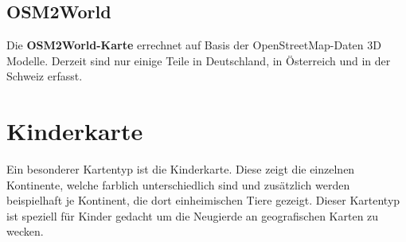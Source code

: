 \documentclass[10pt]{scrreprt}
\begin{document}
\vspace{3mm}
\begin{figure}[!htb]
	\centering
    \hspace{5mm}
\end{figure} 




\subsection{OSM2World}  
Die \textbf{OSM2World-Karte} errechnet auf Basis der OpenStreetMap-Daten 3D Modelle. Derzeit sind nur einige Teile in Deutschland, in Österreich und in der Schweiz erfasst.




\newpage
\section{Kinderkarte}  
Ein besonderer Kartentyp ist die Kinderkarte. Diese zeigt die einzelnen Kontinente, welche farblich unterschiedlich sind und zusätzlich werden beispielhaft je Kontinent, die dort einheimischen Tiere gezeigt. Dieser Kartentyp ist speziell für Kinder gedacht um die Neugierde an geografischen Karten zu wecken.
\end{document}
